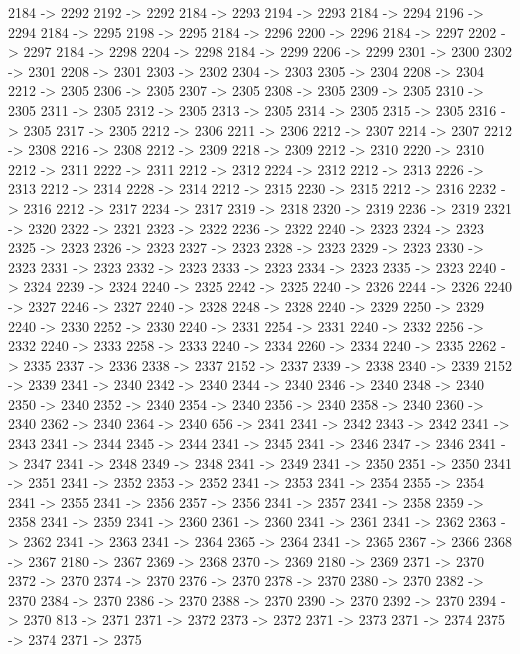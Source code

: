 {	2184 -> 2292
	2192 -> 2292
	2184 -> 2293
	2194 -> 2293
	2184 -> 2294
	2196 -> 2294
	2184 -> 2295
	2198 -> 2295
	2184 -> 2296
	2200 -> 2296
	2184 -> 2297
	2202 -> 2297
	2184 -> 2298
	2204 -> 2298
	2184 -> 2299
	2206 -> 2299
	2301 -> 2300
	2302 -> 2301
	2208 -> 2301
	2303 -> 2302
	2304 -> 2303
	2305 -> 2304
	2208 -> 2304
	2212 -> 2305
	2306 -> 2305
	2307 -> 2305
	2308 -> 2305
	2309 -> 2305
	2310 -> 2305
	2311 -> 2305
	2312 -> 2305
	2313 -> 2305
	2314 -> 2305
	2315 -> 2305
	2316 -> 2305
	2317 -> 2305
	2212 -> 2306
	2211 -> 2306
	2212 -> 2307
	2214 -> 2307
	2212 -> 2308
	2216 -> 2308
	2212 -> 2309
	2218 -> 2309
	2212 -> 2310
	2220 -> 2310
	2212 -> 2311
	2222 -> 2311
	2212 -> 2312
	2224 -> 2312
	2212 -> 2313
	2226 -> 2313
	2212 -> 2314
	2228 -> 2314
	2212 -> 2315
	2230 -> 2315
	2212 -> 2316
	2232 -> 2316
	2212 -> 2317
	2234 -> 2317
	2319 -> 2318
	2320 -> 2319
	2236 -> 2319
	2321 -> 2320
	2322 -> 2321
	2323 -> 2322
	2236 -> 2322
	2240 -> 2323
	2324 -> 2323
	2325 -> 2323
	2326 -> 2323
	2327 -> 2323
	2328 -> 2323
	2329 -> 2323
	2330 -> 2323
	2331 -> 2323
	2332 -> 2323
	2333 -> 2323
	2334 -> 2323
	2335 -> 2323
	2240 -> 2324
	2239 -> 2324
	2240 -> 2325
	2242 -> 2325
	2240 -> 2326
	2244 -> 2326
	2240 -> 2327
	2246 -> 2327
	2240 -> 2328
	2248 -> 2328
	2240 -> 2329
	2250 -> 2329
	2240 -> 2330
	2252 -> 2330
	2240 -> 2331
	2254 -> 2331
	2240 -> 2332
	2256 -> 2332
	2240 -> 2333
	2258 -> 2333
	2240 -> 2334
	2260 -> 2334
	2240 -> 2335
	2262 -> 2335
	2337 -> 2336
	2338 -> 2337
	2152 -> 2337
	2339 -> 2338
	2340 -> 2339
	2152 -> 2339
	2341 -> 2340
	2342 -> 2340
	2344 -> 2340
	2346 -> 2340
	2348 -> 2340
	2350 -> 2340
	2352 -> 2340
	2354 -> 2340
	2356 -> 2340
	2358 -> 2340
	2360 -> 2340
	2362 -> 2340
	2364 -> 2340
	656 -> 2341
	2341 -> 2342
	2343 -> 2342
	2341 -> 2343
	2341 -> 2344
	2345 -> 2344
	2341 -> 2345
	2341 -> 2346
	2347 -> 2346
	2341 -> 2347
	2341 -> 2348
	2349 -> 2348
	2341 -> 2349
	2341 -> 2350
	2351 -> 2350
	2341 -> 2351
	2341 -> 2352
	2353 -> 2352
	2341 -> 2353
	2341 -> 2354
	2355 -> 2354
	2341 -> 2355
	2341 -> 2356
	2357 -> 2356
	2341 -> 2357
	2341 -> 2358
	2359 -> 2358
	2341 -> 2359
	2341 -> 2360
	2361 -> 2360
	2341 -> 2361
	2341 -> 2362
	2363 -> 2362
	2341 -> 2363
	2341 -> 2364
	2365 -> 2364
	2341 -> 2365
	2367 -> 2366
	2368 -> 2367
	2180 -> 2367
	2369 -> 2368
	2370 -> 2369
	2180 -> 2369
	2371 -> 2370
	2372 -> 2370
	2374 -> 2370
	2376 -> 2370
	2378 -> 2370
	2380 -> 2370
	2382 -> 2370
	2384 -> 2370
	2386 -> 2370
	2388 -> 2370
	2390 -> 2370
	2392 -> 2370
	2394 -> 2370
	813 -> 2371
	2371 -> 2372
	2373 -> 2372
	2371 -> 2373
	2371 -> 2374
	2375 -> 2374
	2371 -> 2375
}
